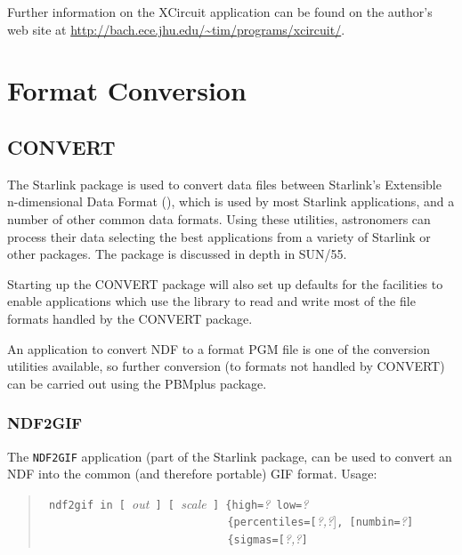 \documentclass[twoside,11pt]{starlink}
\begin{document}

Further information on the XCircuit application can be found on
the author's web site at \url{http://bach.ece.jhu.edu/~tim/programs/xcircuit/}.

\section{Format Conversion\label{sc15_convert}}

\subsection{CONVERT\label{sc15_starlink_convert}}

The Starlink  package is used to convert data
files between Starlink's Extensible n-dimensional Data Format
(), which is used by most Starlink applications,
and a number of other common data formats. Using these utilities,
astronomers can process their data selecting the best applications
from a variety of Starlink or other packages. The package is
discussed in depth in SUN/55.

Starting up the CONVERT package will also set up defaults for the
 facilities to enable
applications which use the  library to read and
write most of the file formats handled by the CONVERT package.

An application to convert NDF to a 
format PGM file is one of the conversion utilities available, so
further conversion (to formats not handled by CONVERT) can be carried
out using the PBMplus package.

\subsubsection{NDF2GIF}

The \texttt{NDF2GIF} application (part of the Starlink
 package, can be used to
convert an NDF into the common (and therefore portable) GIF format.
Usage:

\small
\begin{quote}
\verb+ ndf2gif in [ +\emph{out}\verb+ ] [ +\emph{scale}\verb+ ] {high=+\emph{?}\verb+ low=+\emph{?}\\
\verb+                             {percentiles=[+\emph{?,?}]\verb+, [numbin=+\emph{?}\verb+]+\\
\verb+                             {sigmas=[+\emph{?,?}\verb+]+
\end{quote}
\normalsize
\end{document}
